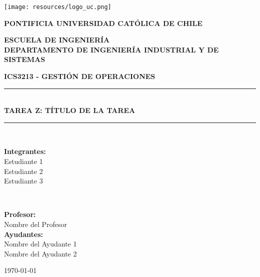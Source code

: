 \begin{titlepage}
    \centering
    \vspace*{1cm}
    
    \texttt{[image: resources/logo\_uc.png]}
    
    \vspace{1.5cm}
    
    {\Large\bfseries PONTIFICIA UNIVERSIDAD CATÓLICA DE CHILE\\}
    
    \vspace{0.5cm}
    
    {\large\bfseries ESCUELA DE INGENIERÍA\\}
    {\large\bfseries DEPARTAMENTO DE INGENIERÍA INDUSTRIAL Y DE SISTEMAS\\}
    
    \vspace{1.5cm}
    
    {\Large\bfseries ICS3213 - GESTIÓN DE OPERACIONES\\}
    
    \vspace{1.5cm}
    
    \rule{\linewidth}{0.5mm}\\[0.4cm]
    {\huge\bfseries TAREA Z: TÍTULO DE LA TAREA\\}
    \rule{\linewidth}{0.5mm}\\[1.5cm]
    
    \vspace{1cm}
    
    \begin{minipage}{0.49\textwidth}
        \begin{flushleft}
            {\large\bfseries Integrantes:}\\
            Estudiante 1\\
            Estudiante 2\\
            Estudiante 3\\
        \end{flushleft}
    \end{minipage}
    ~
    \begin{minipage}{0.49\textwidth}
        \begin{flushright}
            {\large\bfseries Profesor:}\\
            Nombre del Profesor\\
            \vspace{0.5cm}
            {\large\bfseries Ayudantes:}\\
            Nombre del Ayudante 1\\
            Nombre del Ayudante 2\\
        \end{flushright}
    \end{minipage}
    
    \vfill
    
    {\large \today}
    
\end{titlepage}
